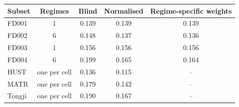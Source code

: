 \begin{tabular}{l c c c c}
\hline
Subset & Regimes & Blind & Normalised & Regime-specific weights \\
\hline
FD001 & 1 & 0.139 & 0.139 & 0.139 \\
FD002 & 6 & 0.148 & 0.137 & 0.136 \\
FD003 & 1 & 0.156 & 0.156 & 0.156 \\
FD004 & 6 & 0.199 & 0.165 & 0.164 \\
HUST & one per cell & 0.136 & 0.115 & -- \\
MATR & one per cell & 0.179 & 0.142 & -- \\
Tongji & one per cell & 0.190 & 0.167 & -- \\
\hline
\end{tabular}
